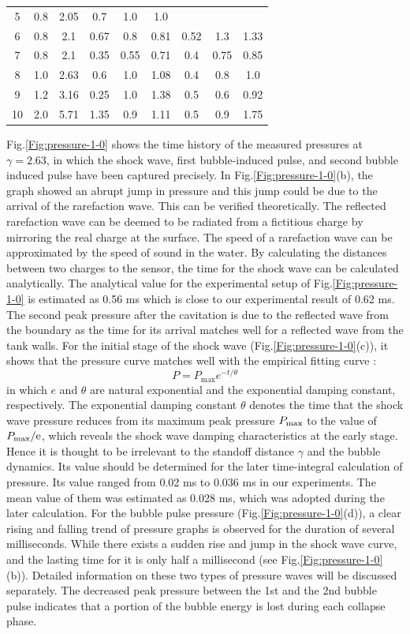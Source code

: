 \documentclass[%
 aip,
 amsmath,amssymb,
 reprint,%
]{revtex4-1}
\begin{document}
{\begin{table}
\begin{ruledtabular}
\begin{tabular}{ccccccccc}
		5&0.8&2.05&0.7&1.0&1.0&&&\\
		6&0.8&2.1&0.67&0.8&0.81&0.52&1.3&1.33\\
		7&0.8&2.1&0.35&0.55&0.71&0.4&0.75&0.85\\
		8&1.0&2.63&0.6&1.0&1.08&0.4&0.8&1.0\\
		9&1.2&3.16&0.25&1.0&1.38&0.5&0.6&0.92\\
		10&2.0&5.71&1.35&0.9&1.11&0.5&0.9&1.75\\
	\end{tabular}
\end{ruledtabular}
	\label{table:pressure measurement}
\end{table}
Fig.\ref{Fig:pressure-1-0} shows the time history of the measured pressures at $\gamma=2.63$, in which the shock wave, first bubble-induced pulse, and second bubble induced pulse have been captured precisely. In Fig.\ref{Fig:pressure-1-0}(b), the graph showed an abrupt jump in pressure and this jump could be due to the arrival of the rarefaction wave. This can be verified theoretically. The reflected rarefaction wave can be deemed to be radiated from a fictitious charge by mirroring the real charge at the surface. The speed of a rarefaction wave can be approximated by the speed of sound in the water. By calculating the distances between two charges to the sensor, the time for the shock wave can be calculated analytically. The analytical value for the experimental setup of Fig.\ref{Fig:pressure-1-0} is estimated as 0.56 ms which is close to our experimental result of 0.62 ms. The second peak pressure after the cavitation is due to the reflected wave from the boundary as the time for its arrival matches well for a reflected wave from the tank walls. { For the initial stage of the shock wave (Fig.\ref{Fig:pressure-1-0}(c)), it shows that the pressure curve matches well with the empirical fitting curve \citep{RN2836}:
	\begin{equation}
	P=P_{\text{max}}e^{-t/\theta}
	\end{equation}
	 	in which $e$ and $\theta$ are natural exponential and the exponential damping constant, respectively. The exponential damping constant $\theta$ denotes the time that the shock wave pressure reduces from its maximum peak pressure $P_{\rm max}$ to the value of $P_{\rm max}/\rm e$, which reveals the shock wave damping characteristics at the early stage. Hence it is thought to be irrelevant to the standoff distance $\gamma$ and the bubble dynamics. Its value should be determined for the later time-integral calculation of pressure. Its value ranged from 0.02 ms to 0.036 ms in our experiments. The mean value of them was estimated as 0.028 ms, which was adopted during the later calculation. } For the bubble pulse pressure (Fig.\ref{Fig:pressure-1-0}(d)), a clear rising and falling trend of pressure graphs is observed for the duration of several milliseconds. While there exists a sudden rise and jump in the shock wave curve, and the lasting time for it is only half a millisecond (see Fig.\ref{Fig:pressure-1-0}(b)). Detailed information on these two types of pressure waves will be discussed separately. The decreased peak pressure between the 1st and the 2nd bubble pulse indicates that a portion of the bubble energy is lost during each collapse phase.
}
\end{document}
